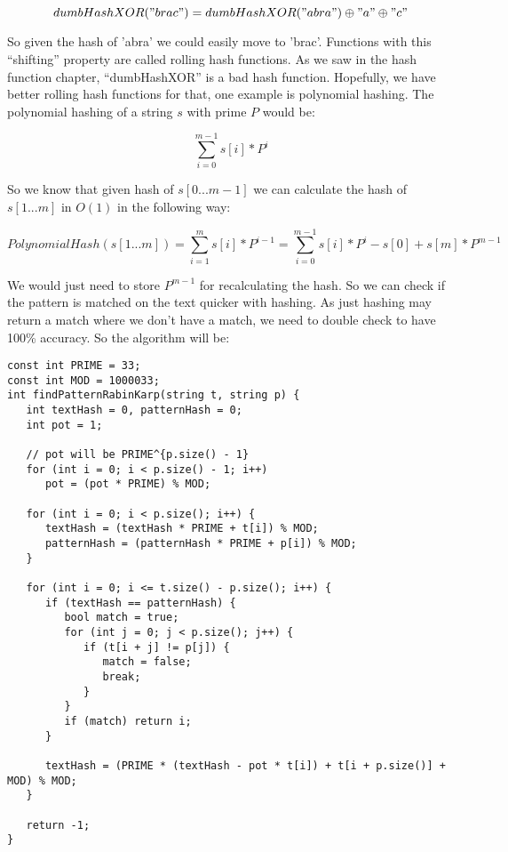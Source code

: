 \[ dumbHashXOR("brac") = dumbHashXOR("abra") \oplus "a" \oplus "c" \]

So given the hash of 'abra' we could easily move to 'brac'. Functions with this ``shifting'' property are called rolling hash functions. As we saw in the hash function chapter, ``dumbHashXOR'' is a bad hash function. Hopefully, we have better rolling hash functions for that, one example is polynomial hashing. The polynomial hashing of a string \( s \) with prime \( P \) would be:

\[ \sum_{i=0}^{m-1}s[i]*P^{i} \]

So we know that given hash of \( s[0...m-1] \) we can calculate the hash of \( s[1...m] \) in \( O(1) \) in the following way:

\[ PolynomialHash(s[1...m]) = \sum_{i=1}^{m}s[i]*P^{i-1} = \sum_{i=0}^{m-1}s[i]*P^{i} - s[0] + s[m] * P^{m-1} \]

We would just need to store \( P^{m-1} \) for recalculating the hash. So we can check if the pattern is matched on the text quicker with hashing. As just hashing may return a match where we don't have a match, we need to double check to have 100\% accuracy. So the algorithm will be:

\begin{lstlisting}
const int PRIME = 33;
const int MOD = 1000033;
int findPatternRabinKarp(string t, string p) {
   int textHash = 0, patternHash = 0;
   int pot = 1;

   // pot will be PRIME^{p.size() - 1}
   for (int i = 0; i < p.size() - 1; i++)
      pot = (pot * PRIME) % MOD;

   for (int i = 0; i < p.size(); i++) {
      textHash = (textHash * PRIME + t[i]) % MOD;
      patternHash = (patternHash * PRIME + p[i]) % MOD;
   }

   for (int i = 0; i <= t.size() - p.size(); i++) {
      if (textHash == patternHash) {
         bool match = true;
         for (int j = 0; j < p.size(); j++) {
            if (t[i + j] != p[j]) {
               match = false;
               break;
            }
         }
         if (match) return i;
      }

      textHash = (PRIME * (textHash - pot * t[i]) + t[i + p.size()] + MOD) % MOD;
   }

   return -1;
}
\end{lstlisting}
